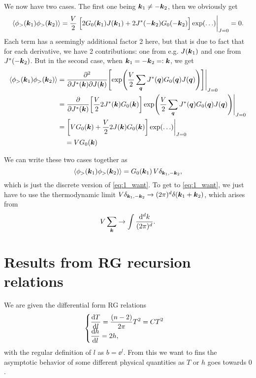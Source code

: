 \documentclass[11pt,letter, swedish, english
]{article}
\begin{document}
We now have two cases. The first one being $\vb*k_1\neq-\vb*k_2$, then
we obviously get
\begin{equation}
\begin{aligned}
\ev{\phi_>(\vb*k_1)\phi_>(\vb*k_2)} 
= \frac{V}{2}\eval{\Big[
2G_0(\vb*k_1)J(\vb*k_1) + 2J^*(-\vb*k_2)G_0(-\vb*k_2)
\Big]\exp(\ldots)}_{J=0} = 0.
\end{aligned}
\end{equation}
Each term has a seemingly additional factor 2 here, but that is due to
fact that for each derivative, we have 2 contributions: one from e.g.
$J(\vb*k_1)$ and one from $J^*(-\vb*k_2)$.
But in the second case, when $\vb*k_1=-\vb*k_2=:\vb*k$, we get
\begin{equation}
\begin{aligned}
\ev{\phi_>(\vb*k_1)\phi_>(\vb*k_2)} 
=&\eval{\pdv[2]{}{J^*(\vb*k)}{J(\vb*k)}
\qty[\exp(\frac{V}{2} \sum_{\vb*q}
J^*(\vb*q)G_0(\vb*q)J(\vb*q))]}_{J=0}\\
=&\eval{\pdv{J^*(\vb*k)}\qty[\frac{V}{2} 
2J^*(\vb*k)G_0(\vb*k)]\exp(\frac{V}{2} \sum_{\vb*q}
J^*(\vb*q)G_0(\vb*q)J(\vb*q))
}_{J=0}\\
=&\eval{\qty[VG_0(\vb*k) + \frac{V}{2} 
2J(\vb*k)G_0(\vb*k)]\exp(\ldots)
}_{J=0}\\
&=VG_0(\vb*k)
\end{aligned}
\end{equation}

We can write these two cases together as
\begin{equation}
\ev{\phi_>(\vb*k_1)\phi_>(\vb*k_2)} 
=G_0(\vb*k_1) \,V\delta_{\vb*k_1, -\vb*k_2},
\end{equation}
which is just the discrete version of \eqref{eq:1_want}. To get to
\eqref{eq:1_want}, we just have to use the thermo\-dynamic limit
$V\delta_{\vb*k_1, -\vb*k_2} \to (2\pi)^d\delta(\vb*k_1+\vb*k_2)$,
which arises from 
\begin{equation}
V\sum_{\vb*k} \to \int\frac{\rd^dk}{(2\pi)^d}.
\end{equation}







\section{Results from RG recursion relations}
\newcommand{\TT}{\tilde{T}}
\newcommand{\hT}{\tilde{h}}
\newcommand{\fs}{f_{\text{s}}}
We are given the differential form RG relations
\begin{equation}\label{eq:2_RG}
\begin{cases}\displaystyle
\dv{T}{l} = \frac{(n-2)}{2\pi}T^2 = CT^2
\\ \displaystyle
\dv{h}{l} = 2h,
\end{cases}
\end{equation}
with the regular definition of $l$ as $b=\ee^l$. From this we want to
fins the asymptotic behavior of some different physical quantities as
$T$ or $h$ goes towards $0$.  
\end{document}
